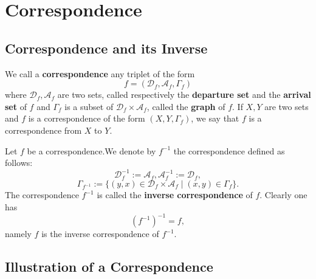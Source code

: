 \chapter{Correspondence}
\section{Correspondence and its Inverse}
\begin{definitionenv}
    We call a \textbf{correspondence} any triplet of the form $$f=(\mathscr{D} _f, \mathscr{A}_f, \Gamma_f)$$
    where $\mathscr{D}_f, \mathscr{A}_f$ are two sets,  called respectively the \textbf{departure set }  and the \textbf{arrival set} of $f$ and $\Gamma_f$ is a subset of $\mathscr{D}_f\times \mathscr{A}_f$,  called the \textbf{graph} of $f$.
    \newline
    If $X, Y$ are two sets and $f$ is a correspondence of the form $(X, Y, \Gamma_f)$, we say that $f$ is a correspondence from $X$ to $Y$. 
\end{definitionenv}
\begin{definitionenv}
    Let $f$ be a correspondence.We denote by $f^{-1}$ the correspondence defined as follows:
    $$\mathscr{D}_f^{-1}:=\mathscr{A}_f, \mathscr{A}_f^{-1}:=\mathscr{D}_f, $$
    $$\Gamma_{f^{-1}}:=\{(y, x)\in \mathscr{D}_f\times \mathscr{A}_f\mid (x, y)\in \Gamma_f\}.$$
    The correspondence $f^{-1}$ is called the \textbf{inverse correspondence} of $f$. Clearly one has $$(f^{-1})^{-1}=f, $$
    namely $f$ is the inverse correspondence of $f^{-1}$.
\end{definitionenv}
\section{Illustration of a Correspondence}
